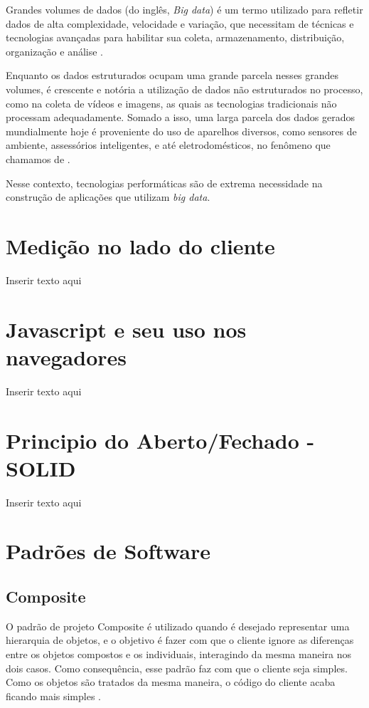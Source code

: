 \documentclass[12pt]{tcc}
\begin{document}
	Grandes volumes de dados (do inglês, \emph{Big data}) é um termo utilizado para refletir dados de alta complexidade, velocidade e variação, que necessitam de técnicas e tecnologias avançadas para habilitar sua coleta, armazenamento, distribuição, organização e análise \citep{Gandomi2015Beyond}. 

	Enquanto os dados estruturados ocupam uma grande parcela nesses grandes volumes, é crescente e notória a utilização de dados não estruturados no processo, como na coleta de vídeos e imagens, as quais as tecnologias tradicionais não processam adequadamente. Somado a isso, uma larga parcela dos dados gerados mundialmente hoje é proveniente do uso de aparelhos diversos, como sensores de ambiente, assessórios inteligentes, e até eletrodomésticos, no fenômeno que chamamos de  \citep{Lee2017293}.

	Nesse contexto, tecnologias performáticas são de extrema necessidade na construção de aplicações que utilizam \emph{big data}.


	\section{Medição no lado do cliente}
	\label{cap:medicao-client-side}
	Inserir texto aqui

	\section{Javascript e seu uso nos navegadores}
	\label{cap:js}
	Inserir texto aqui

	\section{Principio do Aberto/Fechado - SOLID}
	\label{cap:solid}
	Inserir texto aqui

	\section{Padrões de Software}
	\label{cap:padroes-de-software}


	\subsection{Composite}
	\label{subsection:composite}

	O padrão de projeto Composite é utilizado quando é desejado representar uma hierarquia de objetos, e o objetivo é fazer com que o cliente ignore as diferenças entre os objetos compostos e os individuais, interagindo da mesma maneira nos dois casos. Como consequência, esse padrão faz com que o cliente seja simples. Como os objetos são tratados da mesma maneira, o código do cliente acaba ficando mais simples \citep[Capítulo 4]{gamma1994design}.
	
\end{document}
